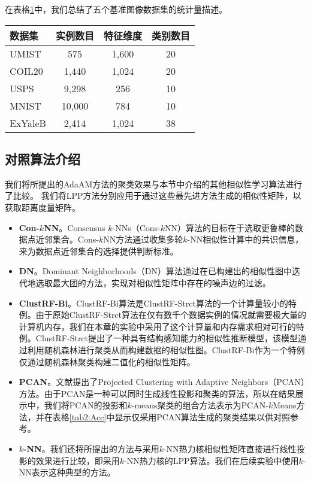 在表格\ref{tab2:Data}中，我们总结了五个基准图像数据集的统计量描述。

\begin{table}[t]
	\label{tab2:Data}
	\centering
	\begin{tabular}{l c c c}
		\toprule
		数据集 & 实例数目 & 特征维度 & 类别数目\\ 
		\midrule
		UMIST & 575 & 1,600 & 20\\
		COIL20 & 1,440 & 1,024 & 20\\
		USPS & 9,298 & 256 & 10\\
		MNIST & 10,000 & 784 & 10\\
		ExYaleB & 2,414 & 1,024 & 38\\
		\bottomrule
	\end{tabular}
\end{table}

\subsection{对照算法介绍}
我们将所提出的AdaAM方法的聚类效果与本节中介绍的其他相似性学习算法进行了比较。 我们将LPP方法分别应用于通过这些最先进方法生成的相似性矩阵，以获取距离度量矩阵。

\begin{itemize}
	\item \textbf{Con-$k$NN}。Consensus $k$-NNs（Cons-$k$NN）算法\cite{premachandran2013consensus}的目标在于选取更鲁棒的数据点近邻集合。Cons-$k$NN方法通过收集多轮$k$-NN相似性计算中的共识信息，来为数据点近邻集合的选择提供判断标准。
	\item \textbf{DN}。Dominant Neighborhoods（DN）算法\cite{pavan2007dominant}通过在已构建出的相似性图中迭代地选取最大团的方法，实现对相似性矩阵中存在的噪声边的过滤。
	\item \textbf{ClustRF-Bi}。ClustRF-Bi算法\cite{criminisi2012decision,pei2013unsupervised,zhu2014constructing}是ClustRF-Strct\cite{zhu2014constructing}算法的一个计算量较小的特例。由于原始ClustRF-Strct算法在仅有数千个数据实例的情况就需要极大量的计算机内存，我们在本章的实验中采用了这个计算量和内存需求相对可行的特例。ClustRF-Strct提出了一种具有结构感知能力的相似性推断模型，该模型通过利用随机森林进行聚类从而构建数据的相似性图。ClustRF-Bi作为一个特例仅通过随机森林聚类构建二值化的相似性矩阵。
	\item \textbf{PCAN}。文献\parencite{nie2014clustering}提出了Projected Clustering with Adaptive Neighbors（PCAN）方法。由于PCAN是一种可以同时生成线性投影和聚类的算法，所以在结果展示中，我们将PCAN的投影和$k$-means聚类的组合方法表示为PCAN-$k$Means方法，并在表格\ref{tab2:Acc}中显示仅采用PCAN算法生成的聚类结果以供对照参考。
	\item \textbf{$k$-NN}。我们还将所提出的方法与采用$k$-NN热力核相似性矩阵直接进行线性投影的效果进行比较，即采用$k$-NN热力核的LPP算法。我们在后续实验中使用$k$-NN表示这种典型的方法。
\end{itemize}


